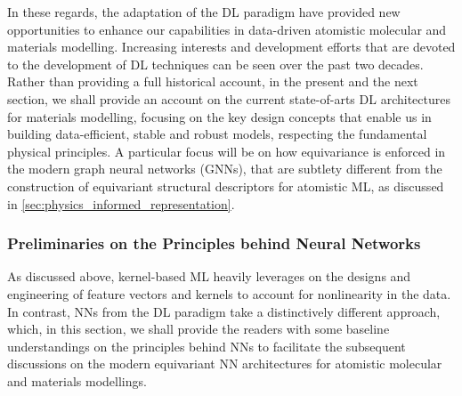 In these regards, the adaptation of the DL paradigm  have provided new opportunities to enhance our capabilities in data-driven  atomistic molecular and materials modelling. Increasing interests and development efforts that are devoted to the development of DL techniques can be seen over the past two decades.\cite{behler2021four} Rather than providing a full historical account, in the present and the next section, we shall provide an account on the current state-of-arts DL architectures for materials modelling, focusing on the key design concepts that enable us in building data-efficient, stable and robust models, respecting the fundamental physical principles. A particular focus will be on how equivariance is enforced in the modern graph neural networks (GNNs),\cite{duval2023hitchhiker} that are subtlety different from the construction of equivariant structural descriptors for atomistic ML, as discussed in \cref{sec:physics_informed_representation}.

\subsubsection{Preliminaries on the Principles behind Neural Networks}

As discussed above, kernel-based ML heavily leverages on the designs and engineering of feature vectors and kernels to account for nonlinearity in the data. In contrast, NNs from the DL paradigm take a distinctively different approach, which, in this section, we shall provide the readers with some baseline understandings on the principles behind NNs to facilitate the subsequent discussions on the modern equivariant NN architectures for atomistic molecular and materials modellings. 

